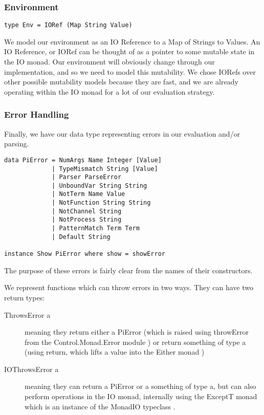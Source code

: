 \subsubsection{Environment}
\label{sec:environment}


\begin{verbatim}
type Env = IORef (Map String Value)
\end{verbatim}

We model our environment as an IO Reference to a Map of Strings to Values. An IO Reference, or IORef \cite{hack:ioref} can be thought of as a pointer to some mutable state in the IO monad. Our environment will obviously change through our implementation, and so we need to model this mutability. We chose IORefs over other possible mutability models because they are fast, and we are already operating within the IO monad for a lot of our evaluation strategy.

\subsubsection{Error Handling}

Finally, we have our data type representing errors in our evaluation and/or parsing.

\begin{verbatim}
data PiError = NumArgs Name Integer [Value]
             | TypeMismatch String [Value]
             | Parser ParseError
             | UnboundVar String String
             | NotTerm Name Value
             | NotFunction String String
             | NotChannel String
             | NotProcess String
             | PatternMatch Term Term
             | Default String

instance Show PiError where show = showError
\end{verbatim}

The purpose of these errors is fairly clear from the names of their constructors.

We represent functions which can throw errors in two ways. They can have two return types:

\begin{description}
    \item[ThrowsError a] meaning they return either a PiError (which is raised using throwError from the Control.Monad.Error module \cite{hack:monadError}) or return something of type a (using return, which lifts a value into the Either monad \cite{hack:either})
    \item[IOThrowsError a] meaning they can return a PiError or a something of type a, but can also perform operations in the IO monad, internally using the ExceptT monad \cite{hack:monadExcept} which is an instance of the MonadIO typeclass \cite{hack:monadIO}.
\end{description}

